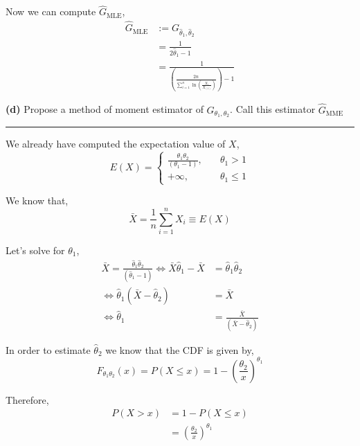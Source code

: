 Now we can compute $\hat{G}_{\text{MLE}}$,
\begin{align*}
  \hat{G}_{\text{MLE}}
    &:= G_{\hat{\theta}_1, \hat{\theta}_2} \\
    &= \frac{1}{2\hat{\theta}_1 - 1} \\
    &= \frac{1}{\left( \frac{2n}{\sum_{i=1}^{n} \ln \left(\frac{X_i}{X_{(1)}} \right)} \right) - 1} 
\end{align*}

\textbf{(d)} Propose a method of moment estimator of $G_{\theta_1, \theta_2}$. Call this estimator $\hat{G}_{\text{MME}}$

\begin{center}\rule{6cm}{0.4pt}\end{center}

We already have computed the expectation value of $X$,
\begin{equation*}
  E(X) = 
    \begin{cases}
      \frac{\theta_1 \theta_2}{(\theta_1 - 1)}, &\quad \theta_1 > 1 \\
      +\infty, &\quad \theta_1 \leq 1
    \end{cases}
\end{equation*}

We know that, 
\begin{equation*}
  \bar{X} = \frac{1}{n} \sum_{i=1}^n X_i \equiv E(X)
\end{equation*}

Let's solve for $\theta_1$,
\begin{align*}
  \bar{X} = \frac{\hat{\theta}_1 \hat{\theta}_2}{(\hat{\theta}_1 - 1)} 
    \iff \bar{X} \hat{\theta}_1 - \bar{X} &= \hat{\theta}_1 \hat{\theta}_2 \\
    \iff \hat{\theta}_1 (\bar{X} - \hat{\theta}_2) &= \bar{X} \\
    \iff \hat{\theta}_1 &= \frac{\bar{X}}{(\bar{X} - \hat{\theta}_2)}
\end{align*}

In order to estimate $\hat{\theta}_2$ we know that the CDF is given by,
\begin{equation*}
  F_{\theta_1 \theta_2}(x) = P(X \leq x) = 1 - \left( \frac{\theta_2}{x} \right)^{\theta_1}
\end{equation*}

Therefore, 
\begin{align*}
  P(X > x) 
    &= 1 - P(X \leq x) \\
    &= \left( \frac{\theta_2}{x} \right)^{\theta_1}
\end{align*}

